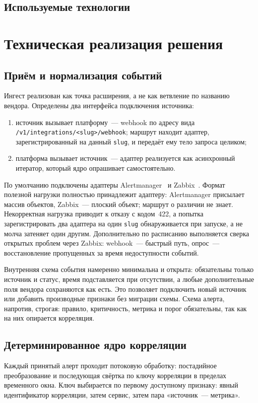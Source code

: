\documentclass[utf8x, 12pt]{G7-32} %
\begin{document}
\section{Используемые технологии}


\chapter{Техническая реализация решения}

\section{Приём и нормализация событий}
Ингест реализован как точка расширения, а не как ветвление по названию
вендора. Определены два интерфейса подключения источника:

\begin{enumerate}[а)]
    \item источник вызывает платформу~--- webhook по адресу вида
          \texttt{/v1/integrations/<slug>/webhook}; маршрут находит адаптер,
          зарегистрированный на данный \texttt{slug}, и передаёт ему тело
          запроса целиком;
    \item платформа вызывает источник~--- адаптер реализуется как
          асинхронный итератор, который ядро опрашивает самостоятельно.
\end{enumerate}

По умолчанию подключены адаптеры Alertmanager~\cite{prometheus} и
Zabbix~\cite{zabbix}. Формат полезной
нагрузки полностью принадлежит адаптеру: Alertmanager присылает массив
объектов, Zabbix~--- плоский объект; маршрут о различии не знает.
Некорректная нагрузка приводит к отказу с кодом~422, а попытка зарегистрировать
два адаптера на один \texttt{slug} обнаруживается при запуске, а не молча
затеняет один другим. Дополнительно по расписанию выполняется сверка открытых
проблем через  Zabbix: webhook~--- быстрый путь, опрос~--- восстановление
пропущенных за время недоступности событий.

Внутренняя схема события намеренно минимальна и открыта: обязательны только
источник и статус, время подставляется при отсутствии, а любые дополнительные
поля вендора сохраняются как есть. Это позволяет подключить новый источник или
добавить производные признаки без миграции схемы. Схема алерта, напротив,
строгая: правило, критичность, метрика и порог обязательны, так как на них
опирается корреляция.

\section{Детерминированное ядро корреляции}
Каждый принятый алерт проходит потоковую обработку: постадийное преобразование
и последующая свёртка по ключу корреляции в пределах временного окна.
Ключ выбирается по первому доступному признаку: явный идентификатор корреляции,
затем сервис, затем пара «источник~--- метрика».
\end{document}
